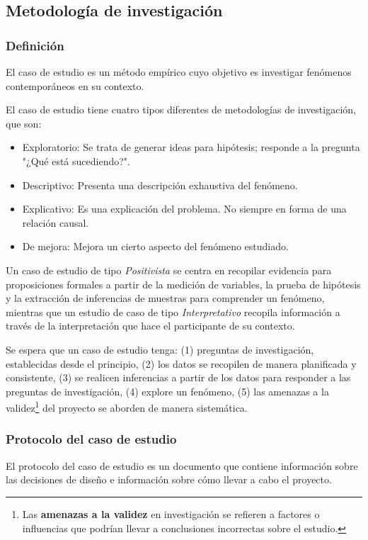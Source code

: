 \subsection{Metodología de investigación}
\subsubsection{Definición}
El caso de estudio es un método empírico cuyo objetivo es investigar fenómenos contemporáneos en su contexto.

El caso de estudio tiene cuatro tipos diferentes de metodologías de investigación, que son:
\begin{itemize}
    \item Exploratorio: Se trata de generar ideas para hipótesis; responde a la pregunta "¿Qué está sucediendo?".
    \item Descriptivo: Presenta una descripción exhaustiva del fenómeno.
    \item Explicativo: Es una explicación del problema.
    No siempre en forma de una relación causal.
    \item De mejora: Mejora un cierto aspecto del fenómeno estudiado.
\end{itemize}

Un caso de estudio de tipo \textit{Positivista} se centra en recopilar evidencia para proposiciones formales a partir de la medición de variables, la prueba de hipótesis y la extracción de inferencias de muestras para comprender un fenómeno, mientras que un estudio de caso de tipo \textit{Interpretativo} recopila información a través de la interpretación que hace el participante de su contexto.

Se espera que un caso de estudio tenga: (1) preguntas de investigación, establecidas desde el principio, (2) los datos se recopilen de manera planificada y consistente, (3) se realicen inferencias a partir de los datos para responder a las preguntas de investigación, (4) explore un fenómeno, (5) las amenazas a la validez\footnote{Las \textbf{amenazas a la validez} en investigación se refieren a factores o influencias que podrían llevar a conclusiones incorrectas sobre el estudio.} del proyecto se aborden de manera sistemática.

\subsubsection{Protocolo del caso de estudio}
El protocolo del caso de estudio es un documento que contiene información sobre las decisiones de diseño e información sobre cómo llevar a cabo el proyecto.

